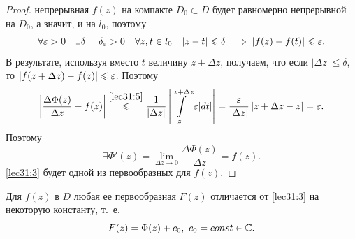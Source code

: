 \documentclass[../../main.tex]{subfiles}
\begin{document}
\begin{proof}
	непрерывная $f(z)$ на компакте $D_0 \subset D$ будет равномерно
	непрерывной на $D_0$, а значит, и на $l_0$, поэтому
	\[ \forall \varepsilon > 0 \quad \exists \delta = \delta_\varepsilon
	> 0 \quad \forall z, t \in l_0 \quad |z - t| \leqslant \delta
	\implies |f(z) - f(t)| \leqslant \varepsilon. \]
	В результате, используя вместо $t$ величину $ z + \Delta z $, получаем, что
	если $| \Delta z| \le \delta$, то
	${| f(z + \Delta z ) - f(z) | \leqslant \varepsilon}$.
	Поэтому
	\[ \left| \dfrac{\Delta \Phi(z)}{\Delta z} - f(z) \right|
	\stackrel{ \eqref{lec31:5} }{\leqslant}
	\dfrac{1}{ | \Delta z | } \left| \int\limits_{z}^{z + \Delta z}
	\varepsilon |dt| \right| = 
	\dfrac{\varepsilon}{ | \Delta z | } \left| z + \Delta
	z - z \right| = \varepsilon.\]
	Поэтому
	\[ \exists \Phi ' (z) = \lim\limits_{\Delta z \to 0}
	\dfrac{\Delta \Phi(z)}{\Delta z} = f(z). \]	
	\eqref{lec31:3} будет одной из первообразных для $f(z)$.
\end{proof}

\begin{crl*}
	Для $ f(z) $ в $D$ любая ее первообразная $F(z)$ отличается от
	\eqref{lec31:3} на некоторую константу,
	т.~е.
	\begin{equation}
	\label{lec31:6}
		F(z) = \Phi(z) + c_0,\ c_0 = const \in \mathbb{C}.
	\end{equation}
\end{crl*}
\end{document}
